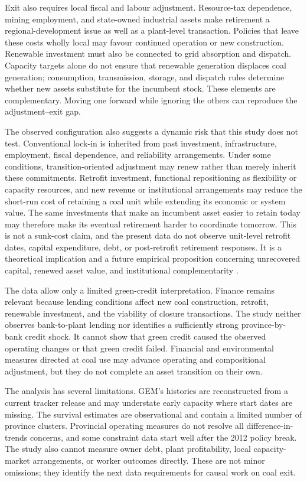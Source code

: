 \documentclass[11pt]{article}
\begin{document}
Exit also requires local fiscal and labour adjustment. Resource-tax dependence, mining employment, and state-owned industrial assets make retirement a regional-development issue as well as a plant-level transaction. Policies that leave these costs wholly local may favour continued operation or new construction. Renewable investment must also be connected to grid absorption and dispatch. Capacity targets alone do not ensure that renewable generation displaces coal generation; consumption, transmission, storage, and dispatch rules determine whether new assets substitute for the incumbent stock. These elements are complementary. Moving one forward while ignoring the others can reproduce the adjustment--exit gap.

The observed configuration also suggests a dynamic risk that this study does not test. Conventional lock-in is inherited from past investment, infrastructure, employment, fiscal dependence, and reliability arrangements. Under some conditions, transition-oriented adjustment may renew rather than merely inherit these commitments. Retrofit investment, functional repositioning as flexibility or capacity resources, and new revenue or institutional arrangements may reduce the short-run cost of retaining a coal unit while extending its economic or system value. The same investments that make an incumbent asset easier to retain today may therefore make its eventual retirement harder to coordinate tomorrow. This is not a sunk-cost claim, and the present data do not observe unit-level retrofit dates, capital expenditure, debt, or post-retrofit retirement responses. It is a theoretical implication and a future empirical proposition concerning unrecovered capital, renewed asset value, and institutional complementarity \parencite{arthur1989,pierson2000,mahoney2000,unruh2000}.

The data allow only a limited green-credit interpretation. Finance remains relevant because lending conditions affect new coal construction, retrofit, renewable investment, and the viability of closure transactions. The study neither observes bank-to-plant lending nor identifies a sufficiently strong province-by-bank credit shock. It cannot show that green credit caused the observed operating changes or that green credit failed. Financial and environmental measures directed at coal use may advance operating and compositional adjustment, but they do not complete an asset transition on their own.

The analysis has several limitations. GEM's histories are reconstructed from a current tracker release and may understate early capacity where start dates are missing. The survival estimates are observational and contain a limited number of province clusters. Provincial operating measures do not resolve all difference-in-trends concerns, and some constraint data start well after the 2012 policy break. The study also cannot measure owner debt, plant profitability, local capacity-market arrangements, or worker outcomes directly. These are not minor omissions; they identify the next data requirements for causal work on coal exit.
\end{document}

